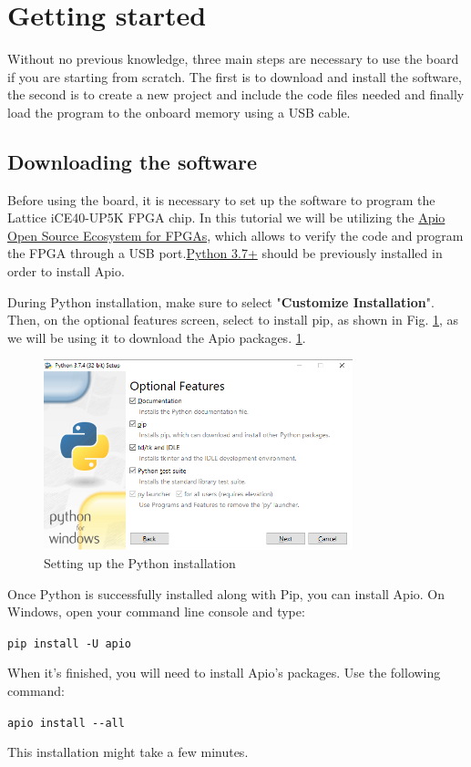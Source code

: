 \documentclass[11pt, a4paper, oneside]{article}
\begin{document}
\section{Getting started}
Without no previous knowledge, three main steps are necessary to use the board if you are starting from scratch. The first is to download and install the software, the second is to create a new project and include the code files needed and finally load the program to the onboard memory using a USB cable.

\subsection{Downloading the software}
Before using the board, it is necessary to set up the software to program the Lattice iCE40-UP5K FPGA chip. In this tutorial we will be utilizing the  \href{https://apiodoc.readthedocs.io/en/stable/index.html}{Apio Open Source Ecosystem for FPGAs}, which allows to verify the code and program the FPGA through a USB port.\href{https://apiodoc.readthedocs.io/en/stable/index.html}{Python 3.7+} should be previously installed in order to install Apio.

During Python installation, make sure to select "\textbf{Customize Installation}". Then, on the optional features screen, select to install pip, as shown in  Fig. \ref{fig2}, as we will be using it to download the Apio packages.
\ref{fig2}.

\begin{figure}[h!]
    \centering
    \includegraphics[width=0.8\textwidth]{figs/python_install.png}
    \caption{Setting up the Python installation}
    \label{fig2}
\end{figure}

Once Python is successfully installed along with Pip, you can install Apio. On Windows, open your command line console and type:
\begin{center}
	\texttt{pip install -U apio}
\end{center}
When it's finished, you will need to install Apio's packages. Use the following command:
\begin{center}
	\texttt{apio install -{}-all}
\end{center}
This installation might take a few minutes.
\end{document}
